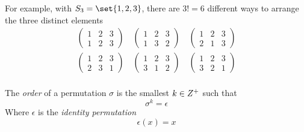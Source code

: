 \begin{remark}
    For example, with $S_3 = \set{1, 2, 3}$, there are $3! = 6$ different ways to arrange the three distinct elements
    \begin{equation}
        \begin{matrix}
            \begin{pmatrix}
                1 & 2 & 3 \\
                1 & 2 & 3
            \end{pmatrix} \quad
            \begin{pmatrix}
                1 & 2 & 3 \\
                1 & 3 & 2
            \end{pmatrix} \quad
            \begin{pmatrix}
                1 & 2 & 3 \\
                2 & 1 & 3
            \end{pmatrix}    \\[1em]
            \begin{pmatrix}
                1 & 2 & 3 \\
                2 & 3 & 1
            \end{pmatrix} \quad
            \begin{pmatrix}
                1 & 2 & 3 \\
                3 & 1 & 2
            \end{pmatrix} \quad
            \begin{pmatrix}
                1 & 2 & 3 \\
                3 & 2 & 1
            \end{pmatrix}\\
        \end{matrix}
    \end{equation}
\end{remark}

\begin{definition}
    The \textit{order} of a permutation $\sigma$ is the smallest $k \in \relax{Z}^{+}$ such that
    \begin{equation}
        \sigma^{k} = \epsilon
    \end{equation}
    Where $\epsilon$ is the \textit{identity permutation}
    \begin{equation}
        \epsilon(x) = x
    \end{equation}
\end{definition}

